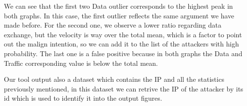 We can see that the first two Data outlier corresponds to the highest peak in both graphs. In this case, the first outlier reflects the same argument we have made before. For the second one, we observe a lower ratio regarding data exchange, but the velocity is way over the total mean, which is a factor to point out the malign intention, so we can add it to the list of the attackers with high probability. The last one is a false positive because in both graphs the Data and Traffic corresponding value is below the total mean.



Our tool output also a dataset which contains the IP and all the statistics previously mentioned, in this dataset we can retrive the IP of the attacker by its id which is used to identify it into the output figures. 
